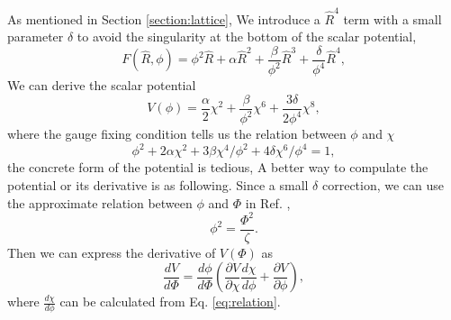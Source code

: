 \documentclass[12pt, a4paper]{article}
\begin{document}
As mentioned in Section \ref{section:lattice}, We introduce a $\hat{R}^4$ term with a small parameter $\delta$ to avoid the singularity at the bottom of the scalar potential,
\begin{equation}
  F\left(\hat{R},\phi\right)=\phi^2\hat{R}+\alpha\hat{R}^2+\frac{\beta}{\phi^2}\hat{R}^3+\frac{\delta}{\phi^4}\hat{R}^4,
\end{equation}
We can derive the scalar potential
\begin{equation}
  V\left(\phi\right)=\frac{\alpha}{2}\chi^2+\frac{\beta}{\phi^2}\chi^6+\frac{3\delta}{2\phi^4}\chi^8,
\end{equation}
where the gauge fixing condition tells us the relation between $\phi$ and $\chi$
\begin{equation}
  \label{eq:relation}
  \phi^2+2\alpha\chi^2+3\beta\chi^4/\phi^2+4\delta\chi^6/\phi^4=1,
\end{equation}
the concrete form of the potential is tedious, A better way to compulate the potential or its derivative is as following. 
Since a small $\delta$ correction, we can use the approximate relation between $\phi$ and $\Phi$ in Ref. \cite{Wang:2023hsb},
\begin{equation}
  \phi^2=\frac{\Phi^2}{\zeta}.
\end{equation}
Then we can express the derivative of $V\left(\Phi\right)$ as 
\begin{equation}
  \frac{dV}{d\Phi}=\frac{d\phi}{d\Phi}\left(\frac{\partial V}{\partial \chi}\frac{d \chi}{d \phi}+\frac{\partial V}{\partial \phi}\right),
\end{equation}
where $\frac{d\chi}{d\phi}$ can be calculated from Eq. \ref{eq:relation}.




\end{document}
